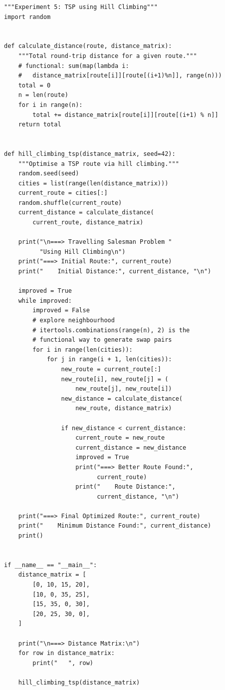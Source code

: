 \documentclass[12pt,a4paper]{article}
\begin{document}
\begin{lstlisting}[style=pythonstyle]
"""Experiment 5: TSP using Hill Climbing"""
import random


def calculate_distance(route, distance_matrix):
    """Total round-trip distance for a given route."""
    # functional: sum(map(lambda i:
    #   distance_matrix[route[i]][route[(i+1)%n]], range(n)))
    total = 0
    n = len(route)
    for i in range(n):
        total += distance_matrix[route[i]][route[(i+1) % n]]
    return total


def hill_climbing_tsp(distance_matrix, seed=42):
    """Optimise a TSP route via hill climbing."""
    random.seed(seed)
    cities = list(range(len(distance_matrix)))
    current_route = cities[:]
    random.shuffle(current_route)
    current_distance = calculate_distance(
        current_route, distance_matrix)

    print("\n===> Travelling Salesman Problem "
          "Using Hill Climbing\n")
    print("===> Initial Route:", current_route)
    print("    Initial Distance:", current_distance, "\n")

    improved = True
    while improved:
        improved = False
        # explore neighbourhood
        # itertools.combinations(range(n), 2) is the
        # functional way to generate swap pairs
        for i in range(len(cities)):
            for j in range(i + 1, len(cities)):
                new_route = current_route[:]
                new_route[i], new_route[j] = (
                    new_route[j], new_route[i])
                new_distance = calculate_distance(
                    new_route, distance_matrix)

                if new_distance < current_distance:
                    current_route = new_route
                    current_distance = new_distance
                    improved = True
                    print("===> Better Route Found:",
                          current_route)
                    print("    Route Distance:",
                          current_distance, "\n")

    print("===> Final Optimized Route:", current_route)
    print("    Minimum Distance Found:", current_distance)
    print()


if __name__ == "__main__":
    distance_matrix = [
        [0, 10, 15, 20],
        [10, 0, 35, 25],
        [15, 35, 0, 30],
        [20, 25, 30, 0],
    ]

    print("\n===> Distance Matrix:\n")
    for row in distance_matrix:
        print("   ", row)

    hill_climbing_tsp(distance_matrix)
\end{lstlisting}
\end{document}
